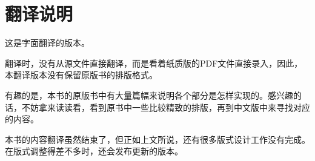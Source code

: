 \chapter*{翻译说明}

这是字面翻译的版本。

翻译时，没有从源文件直接翻译，而是看着纸质版的PDF文件直接录入，因此，本翻译版本没有保留原版书的排版格式。

有趣的是，本书的原版书中有大量篇幅来说明各个部分是怎样实现的。感兴趣的话，不妨拿来读读看，看到原书中一些比较精致的排版，再到中文版中来寻找对应的内容。

本书的内容翻译虽然结束了，但正如上文所说，还有很多版式设计工作没有完成。在版式调整得差不多时，还会发布更新的版本。